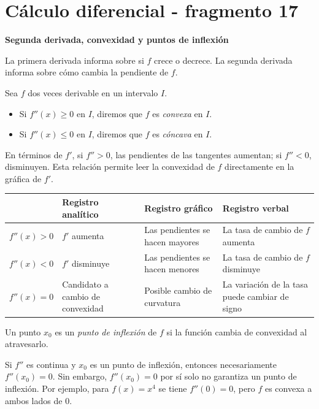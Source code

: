 \section{Cálculo diferencial - fragmento 17}
\textbf{Segunda derivada, convexidad y puntos de inflexión}

La primera derivada informa sobre si $f$ crece o decrece. La segunda derivada informa sobre cómo cambia la pendiente de $f$.

\begin{definition}
Sea $f$ dos veces derivable en un intervalo $I$.
\begin{itemize}
\item Si $f''(x)\geq0$ en $I$, diremos que $f$ es \emph{convexa} en $I$.
\item Si $f''(x)\leq0$ en $I$, diremos que $f$ es \emph{cóncava} en $I$.
\end{itemize}
\end{definition}

En términos de $f'$, si $f''>0$, las pendientes de las tangentes aumentan; si $f''<0$, disminuyen. Esta relación permite leer la convexidad de $f$ directamente en la gráfica de $f'$.

\begin{center}

\begin{tabularx}{\textwidth}{@{}>{\bfseries}lXXX@{}}
\toprule
 & Registro analítico & Registro gráfico & Registro verbal \\
\midrule
$f''(x)>0$ & $f'$ aumenta & Las pendientes se hacen mayores & La tasa de cambio de $f$ aumenta \\
$f''(x)<0$ & $f'$ disminuye & Las pendientes se hacen menores & La tasa de cambio de $f$ disminuye \\
$f''(x)=0$ & Candidato a cambio de convexidad & Posible cambio de curvatura & La variación de la tasa puede cambiar de signo \\
\bottomrule
\end{tabularx}
\end{center}

\begin{definition}
Un punto $x_0$ es un \emph{punto de inflexión} de $f$ si la función cambia de convexidad al atravesarlo.
\end{definition}

Si $f''$ es continua y $x_0$ es un punto de inflexión, entonces necesariamente $f''(x_0)=0$. Sin embargo, $f''(x_0)=0$ por sí solo no garantiza un punto de inflexión. Por ejemplo, para $f(x)=x^4$ se tiene $f''(0)=0$, pero $f$ es convexa a ambos lados de $0$.


